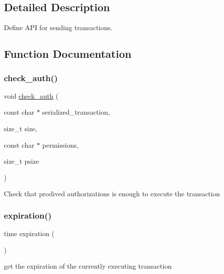 \subsection{Detailed Description}
Define A\+PI for sending transactions. 



\subsection{Function Documentation}
\mbox{\label{group__transactioncapi_ga4eb270c6316a15e6f579b4b448bc8a74}} 
\subsubsection{\texorpdfstring{check\+\_\+auth()}{check\_auth()}}
{\footnotesize\ttfamily void \mbox{\hyperlink{structcheck__auth}{check\+\_\+auth}} (\begin{DoxyParamCaption}\item[{const char $\ast$}]{serialized\+\_\+transaction,  }\item[{size\+\_\+t}]{size,  }\item[{const char $\ast$}]{permissions,  }\item[{size\+\_\+t}]{psize }\end{DoxyParamCaption})}

Check that prodived authorizations is enough to execute the transaction \mbox{\label{group__transactioncapi_ga284f37e545cbb7f847f3ab86f50feb1d}} 
\subsubsection{\texorpdfstring{expiration()}{expiration()}}
{\footnotesize\ttfamily time expiration (\begin{DoxyParamCaption}{ }\end{DoxyParamCaption})}

get the expiration of the currently executing transaction \mbox{\label{group__transactioncapi_gaf1fe78f3caf24010302e5cac1edad61d}} 

